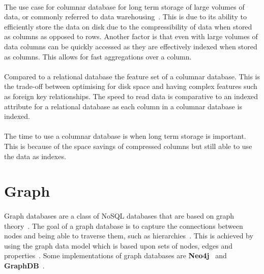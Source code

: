\documentclass{CRPITStyle}
\renewcommand{\cite}{\citep}
\begin{document}
\paragraph{}
The use case for columnar database for long term storage of large volumes of
data, or commonly referred to data warehousing~\cite{usingcolumn,bigtable}.
This is due to its ability to efficiently store the data on disk
due to the compressibility of data when stored as columns as opposed
to rows.
Another factor is that even with large volumes of data columns can
be quickly accessed as they are effectively indexed when stored as
columns.
This allows for fast aggregations over a column.

\paragraph{}
Compared to a relational database the feature set of a columnar database.
This is the trade-off between optimising for disk space and having
complex features such as foreign key relationships.
The speed to read data is comparative to an indexed attribute
for a relational database as each column in a columnar database is
indexed.

\paragraph{}
The time to use a columnar database is when long term storage is important.
This is because of the space savings of compressed columns but still able
to use the data as indexes.


\section{Graph}

\paragraph{}
Graph databases are a class of NoSQL databases that are based on graph
theory~\cite{nosql_survey,sql_nosql}.
The goal of a graph database is to capture the connections between
nodes and being able to traverse them,
such as hierarchies~\cite{type_nosql}.
This is achieved by using the graph data model which is based upon 
sets of nodes, edges and properties~\cite{nosql_survey,sql_nosql}.
Some implementations of graph databases are \textbf{Neo4j}~\cite{neo4j}
and \textbf{GraphDB}~\cite{graphdb}.
\end{document}
